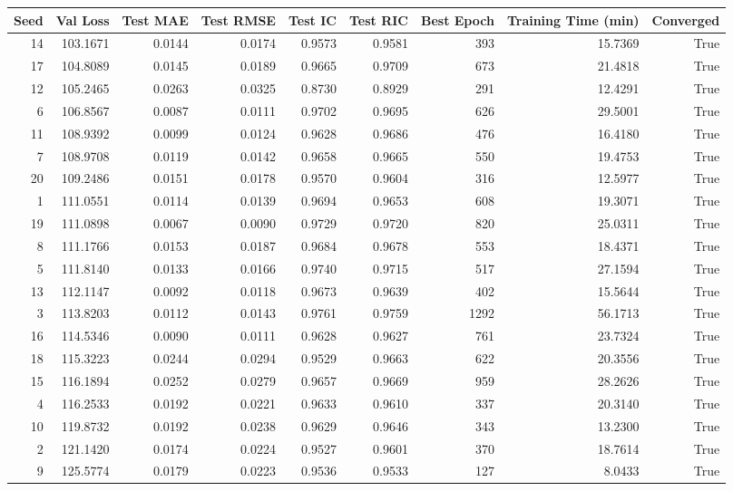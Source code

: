 \begin{tabular}{rrrrrrrrr}
\toprule
Seed & Val Loss & Test MAE & Test RMSE & Test IC & Test RIC & Best Epoch & Training Time (min) & Converged \\
\midrule
14 & 103.1671 & 0.0144 & 0.0174 & 0.9573 & 0.9581 & 393 & 15.7369 & True \\
17 & 104.8089 & 0.0145 & 0.0189 & 0.9665 & 0.9709 & 673 & 21.4818 & True \\
12 & 105.2465 & 0.0263 & 0.0325 & 0.8730 & 0.8929 & 291 & 12.4291 & True \\
6 & 106.8567 & 0.0087 & 0.0111 & 0.9702 & 0.9695 & 626 & 29.5001 & True \\
11 & 108.9392 & 0.0099 & 0.0124 & 0.9628 & 0.9686 & 476 & 16.4180 & True \\
7 & 108.9708 & 0.0119 & 0.0142 & 0.9658 & 0.9665 & 550 & 19.4753 & True \\
20 & 109.2486 & 0.0151 & 0.0178 & 0.9570 & 0.9604 & 316 & 12.5977 & True \\
1 & 111.0551 & 0.0114 & 0.0139 & 0.9694 & 0.9653 & 608 & 19.3071 & True \\
19 & 111.0898 & 0.0067 & 0.0090 & 0.9729 & 0.9720 & 820 & 25.0311 & True \\
8 & 111.1766 & 0.0153 & 0.0187 & 0.9684 & 0.9678 & 553 & 18.4371 & True \\
5 & 111.8140 & 0.0133 & 0.0166 & 0.9740 & 0.9715 & 517 & 27.1594 & True \\
13 & 112.1147 & 0.0092 & 0.0118 & 0.9673 & 0.9639 & 402 & 15.5644 & True \\
3 & 113.8203 & 0.0112 & 0.0143 & 0.9761 & 0.9759 & 1292 & 56.1713 & True \\
16 & 114.5346 & 0.0090 & 0.0111 & 0.9628 & 0.9627 & 761 & 23.7324 & True \\
18 & 115.3223 & 0.0244 & 0.0294 & 0.9529 & 0.9663 & 622 & 20.3556 & True \\
15 & 116.1894 & 0.0252 & 0.0279 & 0.9657 & 0.9669 & 959 & 28.2626 & True \\
4 & 116.2533 & 0.0192 & 0.0221 & 0.9633 & 0.9610 & 337 & 20.3140 & True \\
10 & 119.8732 & 0.0192 & 0.0238 & 0.9629 & 0.9646 & 343 & 13.2300 & True \\
2 & 121.1420 & 0.0174 & 0.0224 & 0.9527 & 0.9601 & 370 & 18.7614 & True \\
9 & 125.5774 & 0.0179 & 0.0223 & 0.9536 & 0.9533 & 127 & 8.0433 & True \\
\bottomrule
\end{tabular}
